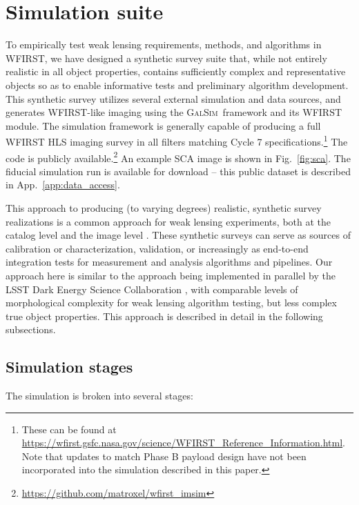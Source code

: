 \documentclass[usenatbib]{mnras}
\newcommand{\galsim}{\textsc{GalSim}}
\begin{document}
\section{Simulation suite}\label{sec:sim}

To empirically test weak lensing requirements, methods, and algorithms in WFIRST, we have designed a synthetic survey suite that, while not entirely realistic in all object properties, contains sufficiently complex and representative objects so as to enable informative tests and preliminary algorithm development. 
This synthetic survey utilizes several external simulation and data sources, and generates WFIRST-like imaging using the \galsim\ framework and its WFIRST module. 
The simulation framework is generally capable of producing a full WFIRST HLS imaging survey in all filters matching Cycle 7 specifications.\footnote{These can be found at \url{https://wfirst.gsfc.nasa.gov/science/WFIRST_Reference_Information.html}. Note that updates to match Phase B payload design have not been incorporated into the simulation described in this paper.} 
The code is publicly available.\footnote{\url{https://github.com/matroxel/wfirst_imsim}} An example SCA image is shown in Fig.~\ref{fig:sca}. The fiducial simulation run is available for download -- this public dataset is described in App.~\ref{app:data_access}.

This approach to producing (to varying degrees) realistic, synthetic survey realizations is a common approach for weak lensing experiments, both at the catalog level \citep{2018MNRAS.480.4614M,2019arXiv190706530K} and the image level \citep{2016MNRAS.457..786S,2017MNRAS.467.1627F,2018MNRAS.481.3170M,2018MNRAS.475.4524S}. These synthetic surveys can serve as sources of calibration or characterization, validation, or increasingly as end-to-end integration tests for measurement and analysis algorithms and pipelines. Our approach here is similar to the approach being implemented in parallel by the LSST Dark Energy Science Collaboration \citep[DESC;][]{2019arXiv190706530K,dc2all}, with comparable levels of morphological complexity for weak lensing algorithm testing, but less complex true object properties. This approach is described in detail in the following subsections.

\subsection{Simulation stages}\label{stages}

The simulation is broken into several stages:
\end{document}
